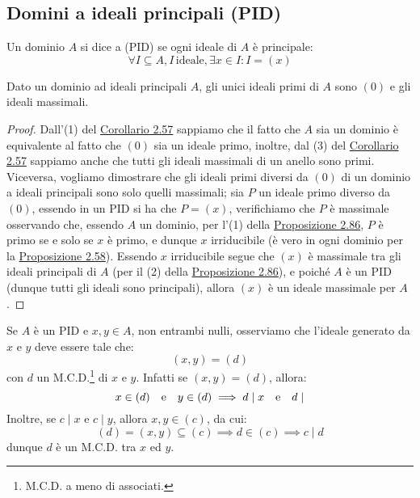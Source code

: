 \documentclass[11pt]{scrartcl}
\begin{document}
\newpage
\subsection{Domini a ideali principali (PID)}
\begin{definition}
    Un dominio $A$ si dice a  (PID) se ogni ideale di $A$ è principale:
    \[ \forall I \subseteq A, I \, \text{ideale}, \exists x \in I : I = (x)
        \]
\end{definition}

\begin{proposition}
    \label{2.95}
    Dato un dominio ad ideali principali $A$, gli unici ideali primi di $A$ sono $(0)$ e gli ideali massimali.
\end{proposition}

\begin{proof}
    Dall'(1) del \hyperref[2.57]{Corollario 2.57} sappiamo che il fatto che $A$ sia un dominio è equivalente al fatto che $(0)$ sia un ideale
    primo, inoltre, dal (3) del \hyperref[2.57]{Corollario 2.57} sappiamo anche che tutti gli ideali massimali di un anello sono primi.\\
    Viceversa, vogliamo dimostrare che gli ideali primi diversi da $(0)$ di un dominio a ideali principali sono solo quelli massimali; sia $P$ un ideale primo diverso da $(0)$, essendo in un PID si ha che
    $P = (x)$, verifichiamo che $P$ è massimale osservando che, essendo $A$ un dominio, per l'(1) della \hyperref[2.86]{Proposizione 2.86}, $P$ è primo se e solo se $x$ è primo, e dunque $x$ irriducibile (è vero in ogni dominio per la \hyperref[2.58]{Proposizione 2.58}).
    Essendo $x$ irriducibile segue che $(x)$ è massimale tra gli ideali principali di $A$ (per il (2) della \hyperref[2.86]{Proposizione 2.86}), e poiché $A$ è un PID (dunque tutti gli ideali sono principali), allora $(x)$ è un ideale massimale per $A$. 
\end{proof}

\begin{remark}
    Se $A$ è un PID e $x,y \in A$, non entrambi nulli, osserviamo che l'ideale generato da $x$ e $y$ deve essere tale che:
    \[ (x,y) = (d)
        \]
    con $d$ un M.C.D.\footnote{M.C.D. a meno di associati.} di $x$ e $y$. Infatti se $(x,y) = (d)$, allora:
    \[ x \in (d) \quad \text e \quad y \in (d) \implies d \mid x \quad \text e \quad d \mid 
        \]
    Inoltre, se $c \mid x$ e $c \mid y$, allora $x,y \in (c)$, da cui:
    \[ (d) = (x,y) \subseteq (c) \implies d \in (c) \implies c \mid d
        \]
    dunque $d$ è un M.C.D. tra $x$ ed $y$.
\end{remark}
\end{document}
